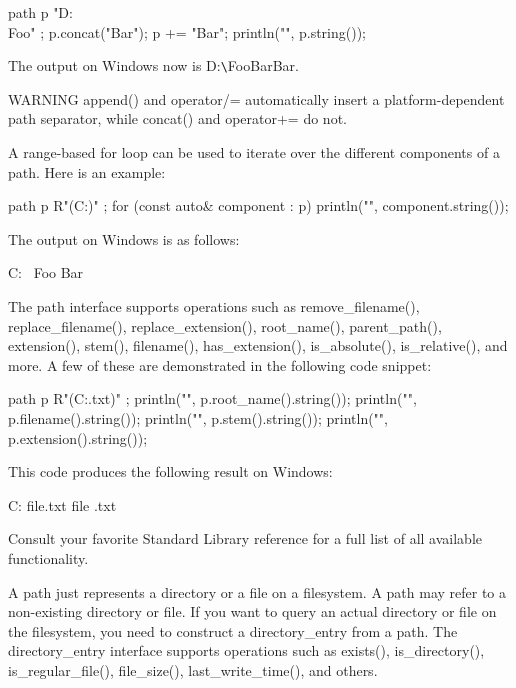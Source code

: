 \begin{cpp}
path p { "D:\\Foo" };
p.concat("Bar");
p += "Bar";
println("{}", p.string());
\end{cpp}

The output on Windows now is D:\verb|\|FooBarBar.

\begin{myWarning}{WARNING}
append() and operator/= automatically insert a platform-dependent path separator, while concat() and operator+= do not.
\end{myWarning}

A range-based for loop can be used to iterate over the different components of a path. Here is an example:

\begin{cpp}
path p { R"(C:\Foo\Bar)" };
for (const auto& component : p) {
    println("{}", component.string());
}
\end{cpp}

The output on Windows is as follows:

\begin{cpp}
C:
\
Foo
Bar
\end{cpp}

The path interface supports operations such as remove\_filename(), replace\_filename(), replace\_extension(), root\_name(), parent\_path(), extension(), stem(), filename(), has\_extension(), is\_absolute(), is\_relative(), and more. A few of these are demonstrated in the following code snippet:

\begin{cpp}
path p { R"(C:\Foo\Bar\file.txt)" };
println("{}", p.root_name().string());
println("{}", p.filename().string());
println("{}", p.stem().string());
println("{}", p.extension().string());
\end{cpp}

This code produces the following result on Windows:

\begin{shell}
C:
file.txt
file
.txt
\end{shell}

Consult your favorite Standard Library reference for a full list of all available functionality.


A path just represents a directory or a file on a filesystem. A path may refer to a non-existing directory or file. If you want to query an actual directory or file on the filesystem, you need to construct a directory\_entry from a path. The directory\_entry interface supports operations such as exists(), is\_directory(), is\_regular\_file(), file\_size(), last\_write\_time(), and others.

